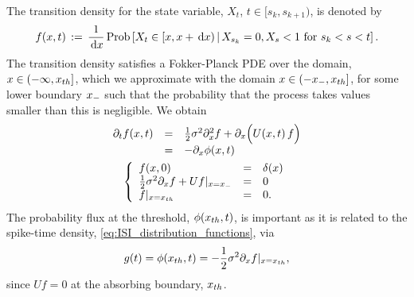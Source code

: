 \documentclass{article}
\begin{document}
The transition density for the state variable, $X_t$, $t \in [s_k, s_{k+1})$, is denoted by
\begin{equation}
f(x,t)  \, := \, \frac{1}{\, \mathrm{d} x }\operatorname{Prob} \left[X_{t} \in [x, x+ \, \mathrm{d} x)  \,|\,
 X_{s_k} = 0, X_{s} < 1  \mbox{ for } s_k < s < t \right]  .
 \label{eq:transition_distribution}
\end{equation} 
The transition density satisfies a Fokker-Planck PDE over the domain, $x \in
(-\infty, { x_{th} }]$, which we approximate with the domain $x \in
(-{ x_{-} }, { x_{th} }]$, for some lower boundary ${ x_{-} }$ such that the
probability that the process takes values smaller than this is negligible. We
obtain
\begin{equation}
\begin{gathered}
\begin{array}{lcl}
	{\partial}_t f (x,t) &=&	\frac{1 }{2}{\sigma }^2  {\partial}^2_x f +
					{\partial}_x  \Big( U(x,t) \, f \Big)
					\\
					&=&
					- {\partial}_x \phi(x,t)
					\end{array}
	\\
	\left\{ \begin{array}{lcl}
	 f (x,0) &=& \delta(x)
	\\
	\frac{1 }{2}{\sigma }^2 {\partial}_xf + U f |_{x={ x_{-} }} &=& 0 
	\\
	f |_{x={ x_{th} }} &=& 0.
	\end{array} \right.
\label{eq:FP_pde_OU_absorbBC}
\end{gathered}
\end{equation}
The probability flux at the threshold, $\phi({ x_{th} }, t)$, is 
important as it is related to the spike-time density,
\cref{eq:ISI_distribution_functions}, via 
\begin{equation}
\label{relation:fg}
g(t)  = \phi({ x_{th} }, t) = -\frac{1 }{2}{\sigma }^2 {\partial}_x
f|_{x={ x_{th} }},
\end{equation}
since $U f = 0$ at the absorbing boundary, ${ x_{th} }$. 

\end{document}
